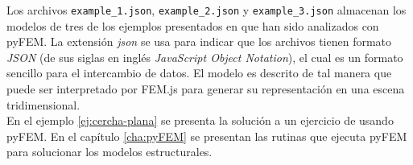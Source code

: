 Los archivos \verb|example_1.json|, \verb|example_2.json| y \verb|example_3.json| almacenan los modelos de tres de los ejemplos presentados en \cite{escamilla1995microcomputadores} que han sido analizados con pyFEM. La extensión \emph{json} se usa para indicar que los archivos tienen formato \emph{JSON} (de sus siglas en inglés \emph{JavaScript Object Notation}), el cual es un formato sencillo para el intercambio de datos. El modelo es descrito de tal manera que puede ser interpretado por FEM.js para generar su representación en una escena tridimensional.\\

En el ejemplo \ref{ej:cercha-plana} se presenta la solución a un ejercicio de \cite{escamilla1995microcomputadores} usando pyFEM. En el capítulo \ref{cha:pyFEM} se presentan las rutinas que ejecuta pyFEM para solucionar los modelos estructurales.\\

